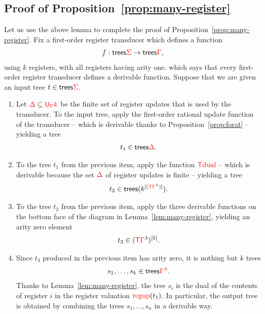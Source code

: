 \subsection{Proof of Proposition~\ref{prop:many-register}}
\label{sec:many-registers-endagme}
Let us use the above lemma to complete the proof of Proposition~\ref{prop:many-register}. Fix a first-order register transducer which defines a function
\begin{align*}
 f : \trees \rSigma \to \trees \rGamma,
\end{align*}
using $k$ registers, with all registers having arity one. 
 which says that every first-order register transducer defines a derivable function.  Suppose that we are given an input tree $t \in \trees \rSigma$. 
\begin{enumerate}
    \item Let $\rDelta \subseteq \regup \rGamma k$ be the finite set of register updates that is used by the transducer. To the input tree, apply the first-order rational update function of the transducer -- which is  derivable thanks to Proposition~\ref{prop:forat} --   yielding a tree
    \begin{align*}
    t_1 \in \trees \rDelta.
    \end{align*}
    \item  To the tree $t_1$ from the  previous item, apply the function $\tmonad \dualt$ -- which is derivable because the set $\rDelta$ of register updates is finite -- yielding a tree 
    \begin{align*}
    t_2 \in \trees (\matrixpower{(\tmonad \rGamma^\lambda)} k).
    \end{align*}
    \item To the tree $t_2$ from the previous item, apply the 
     three derivable functions on the bottom face of the diagram in Lemma~\ref{lem:many-register}, yielding an arity zero element 
     \begin{align*}
        t_3 \in (\tmonad \rGamma^\lambda)^{[k]}.
     \end{align*}
     \item Since $t_3$ produced in the previous item has arity zero, it is nothing but $k$ trees
\begin{align*}
s_1,\ldots,s_k \in \trees \ranked{\rGamma^\lambda}.
\end{align*}
     Thanks to Lemma~\ref{lem:many-register}, the tree $s_i$ is the dual of the contents of register $i$ in the register valuation $\regupt(t_1)$. In particular, the output tree is obtained by combining the trees $s_1,\ldots,s_n$ in a derivable way. 
\end{enumerate}

